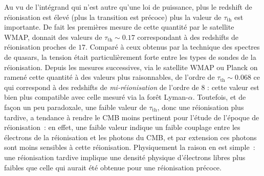 Au vu de l'intégrand qui n'est autre qu'une loi de puissance, plus le redshift de réionisation est élevé (plus la transition est précoce) plus la valeur de $\tau_\mathrm{th}$ est importante. De fait les premières mesure de cette quantité par le satellite WMAP, donnait des valeurs de $\tau_\mathrm{th}\sim 0.17$ correspondant à des redshifts de réionisation proches de $17$. Comparé à ceux obtenus par la technique des spectres de quasars, la tension était particulièrement forte entre les types de sondes de la réionisation. Depuis les mesures successives, via le satellite WMAP ou Planck on ramené cette quantité à des valeurs plus raisonnables, de l'ordre de $\tau_\mathrm{th}\sim 0.068$ ce qui correspond à des redshifts de \textit{mi-réionisation} de l'ordre de 8 : cette valeur est bien plus compatible avec celle mesuré via la forêt Lyman-$\alpha$. Toutefois, et de façon un peu paradoxale, une faible valeur de $\tau_\mathrm{th}$, donc une réionisation plus tardive, a tendance à rendre le CMB moins pertinent pour l'étude de l'époque de réionisation~: en effet, une faible valeur indique un faible couplage entre les électrons de la réionisation et les photons du CMB, et par extension ces photons sont moins sensibles à cette réionisation. Physiquement la raison en est simple~: une réionisation tardive implique une densité physique d'électrons libres plus faibles que celle qui aurait été obtenue pour une réionisation précoce.

